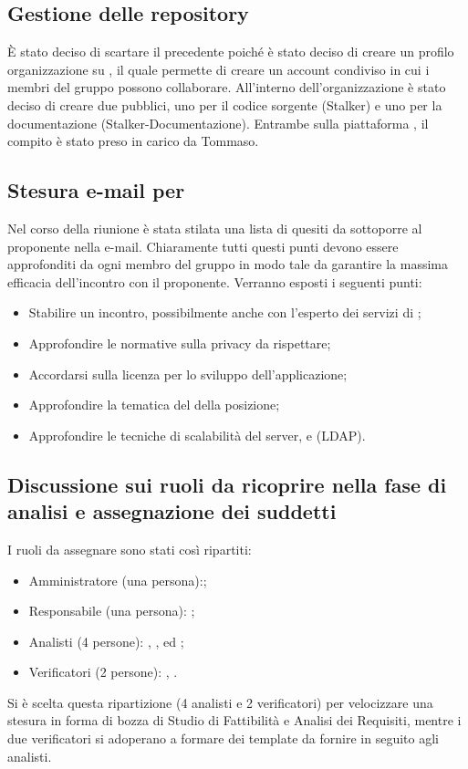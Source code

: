 \subsection{Gestione delle repository}
È stato deciso di scartare il precedente  poiché è stato deciso di creare un profilo organizzazione su , il quale permette di creare un account condiviso in cui i membri del gruppo possono collaborare.
All'interno dell'organizzazione è stato deciso di creare due  pubblici, uno per il codice sorgente (Stalker) e uno per la documentazione (Stalker-Documentazione).
Entrambe sulla piattaforma , il compito è stato preso in carico da Tommaso. 

\subsection{Stesura e-mail per \Proponente{}}
Nel corso della riunione è stata stilata una lista di quesiti da sottoporre al proponente nella e-mail. 
Chiaramente tutti questi punti devono essere approfonditi da ogni membro del gruppo in modo tale da garantire la massima efficacia dell'incontro con il proponente.
Verranno esposti i seguenti punti:
\begin{itemize}
\item Stabilire un incontro, possibilmente anche con l'esperto dei servizi di ;
\item Approfondire le normative sulla privacy da rispettare;
\item Accordarsi sulla licenza per lo sviluppo dell'applicazione;
\item Approfondire la tematica del  della posizione;
\item Approfondire le tecniche di scalabilità del server, e  (LDAP).
\end{itemize} 

\subsection{Discussione sui ruoli da ricoprire nella fase di analisi e assegnazione dei suddetti}
I ruoli da assegnare sono stati così ripartiti: 
\begin{itemize}
\item Amministratore (una persona):\AT{};
\item Responsabile (una persona): \SE{};
\item Analisti (4 persone): \LD{}, \BR{}, \PF{} ed \CE{};
\item Verificatori (2 persone): \DF{}, \MC{}.
\end{itemize}
Si è scelta questa ripartizione (4 analisti e 2 verificatori) per velocizzare una stesura in forma di bozza di Studio di Fattibilità e Analisi dei Requisiti, mentre i due verificatori si adoperano a formare dei template da fornire in seguito agli analisti.

